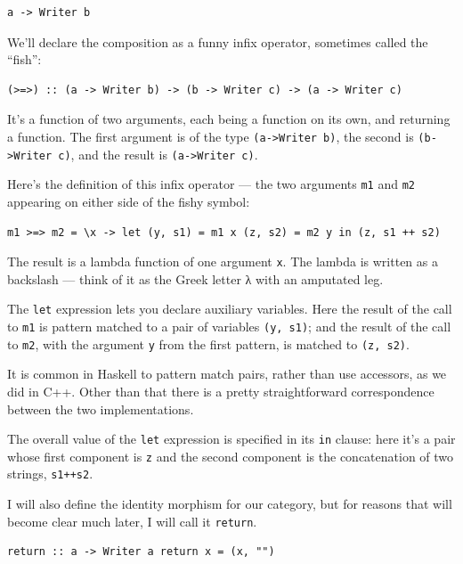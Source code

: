\begin{verbatim}
a -> Writer b
\end{verbatim}

We'll declare the composition as a funny infix operator, sometimes
called the ``fish'':

\begin{verbatim}
(>=>) :: (a -> Writer b) -> (b -> Writer c) -> (a -> Writer c)
\end{verbatim}

It's a function of two arguments, each being a function on its own, and
returning a function. The first argument is of the type
\texttt{(a-\textgreater{}Writer\ b)}, the second is
\texttt{(b-\textgreater{}Writer\ c)}, and the result is
\texttt{(a-\textgreater{}Writer\ c)}.

Here's the definition of this infix operator --- the two arguments
\texttt{m1} and \texttt{m2} appearing on either side of the fishy
symbol:

\begin{verbatim}
m1 >=> m2 = \x -> let (y, s1) = m1 x (z, s2) = m2 y in (z, s1 ++ s2)
\end{verbatim}

The result is a lambda function of one argument \texttt{x}. The lambda
is written as a backslash --- think of it as the Greek letter λ with an
amputated leg.

The \texttt{let} expression lets you declare auxiliary variables. Here
the result of the call to \texttt{m1} is pattern matched to a pair of
variables \texttt{(y,\ s1)}; and the result of the call to \texttt{m2},
with the argument \texttt{y} from the first pattern, is matched to
\texttt{(z,\ s2)}.

It is common in Haskell to pattern match pairs, rather than use
accessors, as we did in C++. Other than that there is a pretty
straightforward correspondence between the two implementations.

The overall value of the \texttt{let} expression is specified in its
\texttt{in} clause: here it's a pair whose first component is \texttt{z}
and the second component is the concatenation of two strings,
\texttt{s1++s2}.

I will also define the identity morphism for our category, but for
reasons that will become clear much later, I will call it
\texttt{return}.

\begin{verbatim}
return :: a -> Writer a return x = (x, "")
\end{verbatim}

